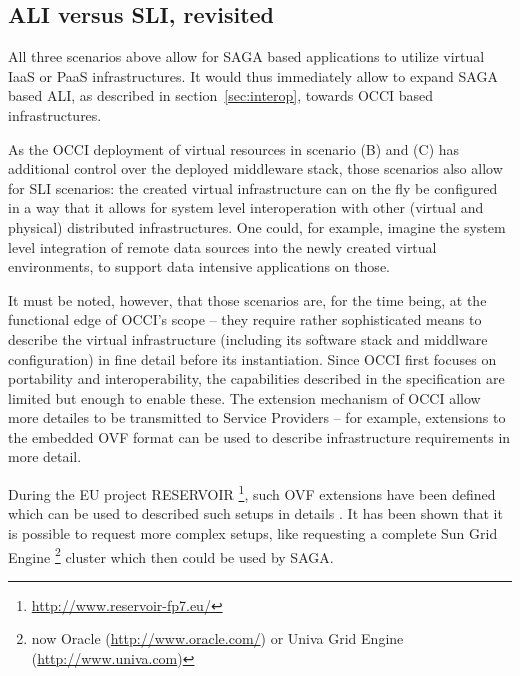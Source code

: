 \documentclass[10pt,conference,final,letterpaper,twoside,twocolumn,]{IEEEtran}
\begin{document}


 \subsection{ALI versus SLI, revisited}

 All three scenarios above allow for SAGA based applications to
 utilize virtual IaaS or PaaS infrastructures.  It would thus
 immediately allow to expand SAGA based ALI, as described in
 section~\ref{sec:interop}, towards OCCI based infrastructures.

 As the OCCI deployment of virtual resources in scenario (B) and (C)
 has additional control over the deployed middleware stack, those
 scenarios also allow for SLI scenarios: the created virtual
 infrastructure can on the fly be configured in a way that it allows
 for system level interoperation with other (virtual and physical)
 distributed infrastructures.  One could, for example, imagine the
 system level integration of remote data sources into the newly
 created virtual environments, to support data intensive applications
 on those.

 It must be noted, however, that those scenarios are, for the time
 being, at the functional edge of OCCI's scope -- they require rather
 sophisticated means to describe the virtual infrastructure (including
 its software stack and middlware configuration) in fine detail before
 its instantiation. Since OCCI first focuses on portability and
 interoperability, the capabilities described in the specification are
 limited but enough to enable these. The extension mechanism of OCCI
 allow more detailes to be transmitted to Service Providers -- for
 example, extensions to the embedded OVF format can be used to describe
 infrastructure requirements in more detail.

 During the EU project RESERVOIR
 \footnote{\url{http://www.reservoir-fp7.eu/}}, such OVF extensions have been
 defined which can be used to described such setups in details
 \cite{comsware09}.  It has been shown that it is possible to request
 more complex setups, like requesting a complete Sun Grid Engine
 \footnote{now Oracle (\url{http://www.oracle.com/}) or Univa Grid
 Engine (\url{http://www.univa.com})} cluster which then could be used
 by SAGA.
\end{document}
